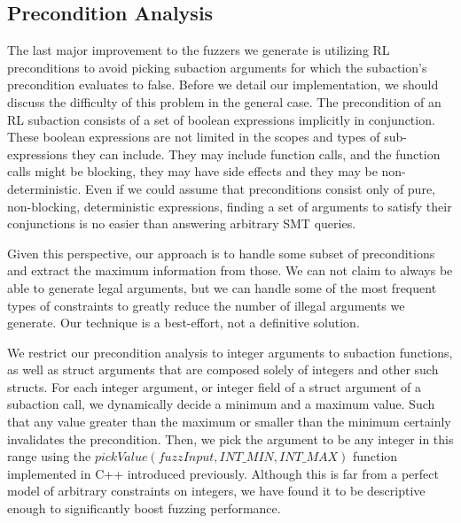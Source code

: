\subsection{Precondition Analysis} \label{preconditionAnalysis}
The last major improvement to the fuzzers we generate is utilizing RL preconditions to avoid picking subaction arguments for which the subaction's precondition evaluates to false.
Before we detail our implementation, we should discuss the difficulty of this problem in the general case.
The precondition of an RL subaction consists of a set of boolean expressions implicitly in conjunction.
These boolean expressions are not limited in the scopes and types of sub-expressions they can include.
They may include function calls, and the function calls might be blocking, they may have side effects and they may be non-deterministic.
Even if we could assume that preconditions consist only of pure, non-blocking, deterministic expressions, finding a set of arguments to satisfy their conjunctions is no easier than answering arbitrary SMT queries.

Given this perspective, our approach is to handle some subset of preconditions and extract the maximum information from those.
We can not claim to always be able to generate legal arguments, but we can handle some of the most frequent types of constraints to greatly reduce the number of illegal arguments we generate.
Our technique is a best-effort, not a definitive solution.

We restrict our precondition analysis to integer arguments to subaction functions, as well as struct arguments that are composed solely of integers and other such structs.
For each integer argument, or integer field of a struct argument of a subaction call, we dynamically decide a minimum and a maximum value.
Such that any value greater than the maximum or smaller than the minimum certainly invalidates the precondition.
Then, we pick the argument to be any integer in this range using the $pickValue(fuzzInput, INT\_MIN, INT\_MAX)$ function implemented in C++ introduced previously.
Although this is far from a perfect model of arbitrary constraints on integers, we have found it to be descriptive enough to significantly boost fuzzing performance.

